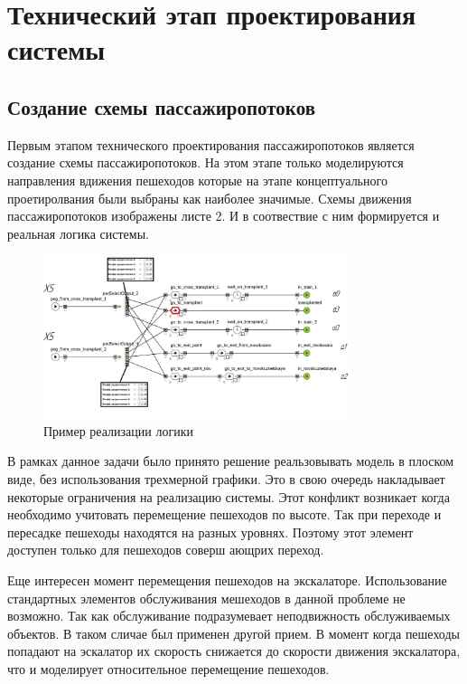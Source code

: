 \documentclass[12pt]{article}
\begin{document}
\newpage
\section{Технический этап проектирования системы}
		\subsection{Создание схемы пассажиропотоков}

	
Первым этапом технического проектирования пассажиропотоков является создание  схемы пассажиропотоков. На этом этапе только моделируются направления вдижения пешеходов которые на этапе концептуального проетиролвания были выбраны как наиболее значимые. Схемы движения пассажиропотоков изображены  листе 2.  И в соотвествие с ним формируется и реальная логика системы.

 \begin{figure}
  	\begin{center}
  	  	\includegraphics[width=0.8\textwidth]{logic_1.jpg}
 	 \end{center}
	  	\caption{Пример реализации логики}
\end{figure}

  В рамках данное задачи было принято решение реальзовывать модель в плоском виде, без использования трехмерной графики. Это в свою очередь накладывает некоторые ограничения на реализацию системы. Этот конфликт возникает когда необходимо учитовать перемещение пешеходов по высоте. Так при переходе и пересадке пешеходы находятся на разных уровнях. Поэтому этот элемент доступен только для пешеходов соверш	ающрих переход. 

Еще интересен момент перемещения пешеходов на экскалаторе. Использование стандартных элементов обслуживания мешеходов в данной проблеме не возможно. Так как обслуживание подразумевает неподвижность обслуживаемых объектов. В таком сличае был применен другой прием. В момент когда пешеходы попадают на эскалатор их скорость снижается до скорости движения экскалатора, что и моделирует относительное перемещение пешеходов. 
\end{document}
